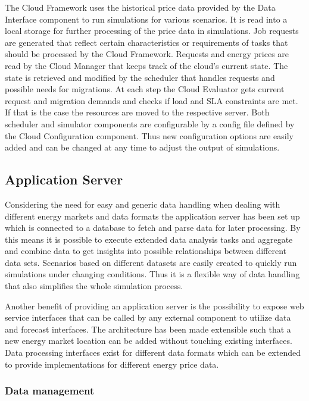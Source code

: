 The Cloud Framework uses the historical price data provided by the Data Interface component to run simulations for various scenarios. It is read into a local storage for further processing of the price data in simulations. Job requests are generated that reflect certain characteristics or requirements of tasks that should be processed by the Cloud Framework. Requests and energy prices are read by the Cloud Manager that keeps track of the cloud's current state. The state is retrieved and modified by the scheduler that handles requests and possible needs for migrations. At each step the Cloud Evaluator gets current request and migration demands and checks if load and SLA constraints are met. If that is the case the resources are moved to the respective server. Both scheduler and simulator components are configurable by a config file defined by the Cloud Configuration component. Thus new configuration options are easily added and can be changed at any time to adjust the output of simulations. 


\subsection{Application Server}

Considering the need for easy and generic data handling when dealing with different energy markets and data formats the application server has been set up which is connected to a database to fetch and parse data for later processing. By this means it is possible to execute extended data analysis tasks and aggregate and combine data to get insights into possible relationships between different data sets. Scenarios based on different datasets are easily created to quickly run simulations under changing conditions. Thus it is a flexible way of data handling that also simplifies the whole simulation process. 

Another benefit of providing an application server is the possibility to expose web service interfaces that can be called by any external component to utilize data and forecast interfaces. The architecture has been made extensible such that a new energy market location can be added without touching existing interfaces. 
Data processing interfaces exist for different data formats which can be extended to provide implementations for different energy price data. 

\subsubsection{Data management}

